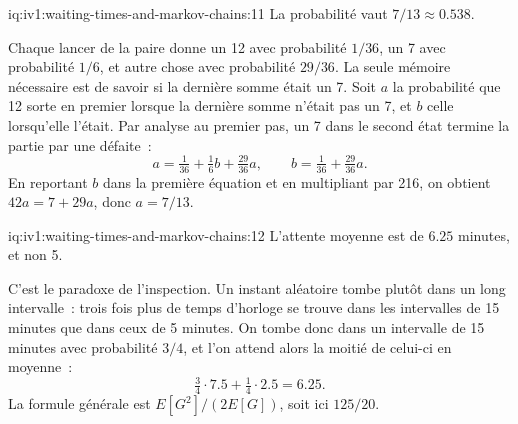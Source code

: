 \begin{solution}{iq:iv1:waiting-times-and-markov-chains:11}
La probabilité vaut $7/13 \approx 0.538$.

Chaque lancer de la paire donne un 12 avec probabilité $1/36$, un 7 avec probabilité $1/6$, et autre chose avec probabilité $29/36$. La seule mémoire nécessaire est de savoir si la dernière somme était un 7. Soit $a$ la probabilité que 12 sorte en premier lorsque la dernière somme n'était pas un 7, et $b$ celle lorsqu'elle l'était. Par analyse au premier pas, un 7 dans le second état termine la partie par une défaite~:
\[
a = \tfrac{1}{36} + \tfrac16 b + \tfrac{29}{36} a, \qquad b = \tfrac{1}{36} + \tfrac{29}{36} a.
\]
En reportant $b$ dans la première équation et en multipliant par 216, on obtient $42a = 7 + 29a$, donc $a = 7/13$.

\end{solution}

\begin{solution}{iq:iv1:waiting-times-and-markov-chains:12}
L'attente moyenne est de $6.25$ minutes, et non 5.

C'est le paradoxe de l'inspection. Un instant aléatoire tombe plutôt dans un long intervalle~: trois fois plus de temps d'horloge se trouve dans les intervalles de 15 minutes que dans ceux de 5 minutes. On tombe donc dans un intervalle de 15 minutes avec probabilité $3/4$, et l'on attend alors la moitié de celui-ci en moyenne~:
\[
\tfrac34 \cdot 7.5 + \tfrac14 \cdot 2.5 = 6.25.
\]
La formule générale est $E[G^2]/(2E[G])$, soit ici $125/20$.

\end{solution}

